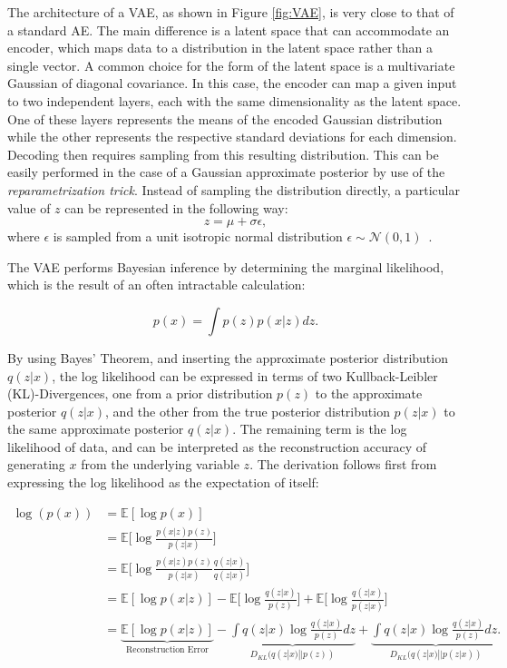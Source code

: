 \documentclass[12pt, a4paper]{article}
\begin{document}
The architecture of a VAE, as shown in Figure \ref{fig:VAE}, is very close to that of a standard AE. 
The main difference is a latent space that can accommodate an encoder, which maps data to a distribution in the latent space rather than a single vector. 
A common choice for the form of the latent space is a multivariate Gaussian of diagonal covariance. 
In this case, the encoder can map a given input to two independent layers, 
each with the same dimensionality as the latent space.
One of these layers represents the means of the encoded Gaussian distribution while the other represents the respective standard deviations for each dimension.
Decoding then requires sampling from this resulting distribution. 
This can be easily performed in the case of a Gaussian approximate posterior by use of the \textit{reparametrization trick}.
Instead of sampling the distribution directly, a particular value of $z$ can be represented in the following way:
\begin{equation}
z=\mu + \sigma \epsilon,
\end{equation}
where $\epsilon$ is sampled from a unit isotropic normal distribution $\epsilon \sim \mathcal{N}(0, 1)$~\cite{kingma2014autoencoding}.


The VAE performs Bayesian inference by determining the marginal likelihood, which is the result of an often intractable calculation:

\begin{equation}
p(x) = \int p(z)p(x|z)dz.
\end{equation}

By using Bayes' Theorem, and inserting the approximate posterior distribution $q(z|x)$, the log likelihood can be expressed in terms of two Kullback-Leibler (KL)-Divergences, one from a prior distribution $p(z)$ to the approximate posterior $q(z|x)$, and the other from the true posterior distribution $p(z|x)$ to the same approximate posterior $q(z|x)$. The remaining term is the log likelihood of data, and can be interpreted as the reconstruction accuracy of generating $x$ from the underlying variable $z$. The derivation follows first from expressing the log likelihood as the expectation of itself:

\begin{equation}
	\begin{split}
		\log(p(x))  &= \mathbb{E}[\log p(x)] \\
  		&= \mathbb{E}\bigg[\log \frac{p(x|z)p(z)}{p(z|x)}\bigg] \\
  		&= \mathbb{E}\bigg[\log \frac{p(x|z)p(z)}{p(z|x)} \frac{q(z|x)}{q(z|x)}\bigg] \\
  		&= \mathbb{E}[\log p(x|z)] - \mathbb{E}\bigg[\log \frac{q(z|x)}{p(z)}\bigg] + \mathbb{E} \bigg[\log \frac{q(z|x)}{p(z|x)}\bigg] \\
  		&= \underbrace{\mathbb{E}[\log p(x|z)]}_\text{Reconstruction Error} - \underbrace{\int q(z|x)\log \frac{q(z|x)}{p(z)}dz}_{D_{KL}(q(z|x)||p(z))} + \underbrace{\int q(z|x)\log \frac{q(z|x)}{p(z)}dz.}_{D_{KL}(q(z|x)||p(z|x))}
  \end{split}
\end{equation} 
\end{document}
